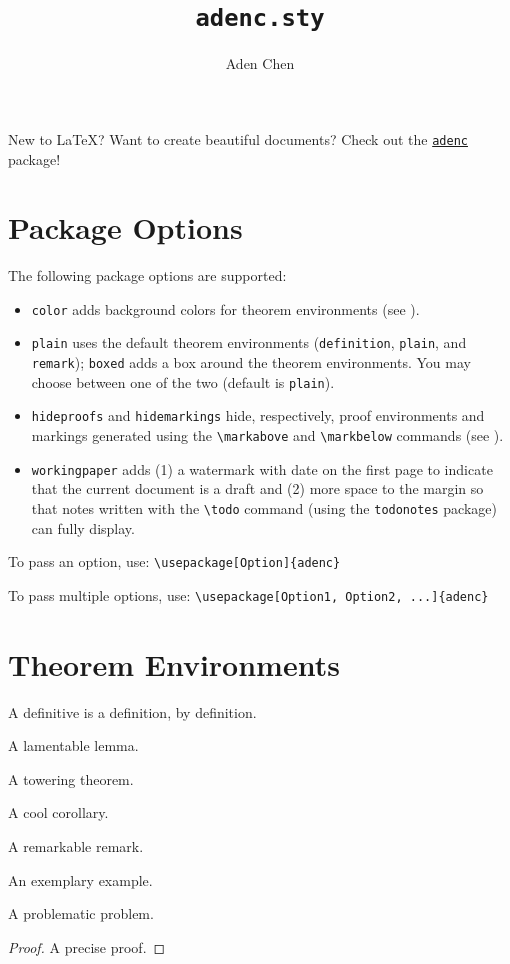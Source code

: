 \documentclass[11pt,oneside,letterpaper]{amsart}
\title{\texttt{adenc.sty}}
\author{Aden Chen}
\begin{document}
\maketitle
\tableofcontents

New to \LaTeX?
Want to create beautiful documents?
Check out the \href{https://github.com/AdenChen27/latex}{\texttt{adenc}} package!

\section{Package Options}
The following package options are supported:
\begin{itemize}
  \item \verb|color| adds background colors for theorem environments (see ). 
  \item \verb|plain| uses the default theorem environments (\texttt{definition}, \texttt{plain}, and \texttt{remark}); \verb|boxed| adds a box around the theorem environments.
  You may choose between one of the two (default is \verb|plain|).
  \item \verb|hideproofs| and \verb|hidemarkings| hide, respectively, proof environments and markings generated using the \verb|\markabove| and \verb|\markbelow| commands (see ). 
  \item \verb|workingpaper| adds (1) a watermark with date on the first page to indicate that the current document is a draft and (2) more space to the margin so that notes written with the \verb|\todo| command (using the \verb|todonotes| package) can fully display. 
\end{itemize}

\noindent
To pass an option, use: \verb|\usepackage[Option]{adenc}|

\noindent
To pass multiple options, use: \verb|\usepackage[Option1, Option2, ...]{adenc}|


\section{Theorem Environments}
\label{sec:thm-env}

\begin{definition}
  A definitive  is a definition, by definition. 
\end{definition}
\begin{lemma}
  A lamentable lemma. 
\end{lemma}
\begin{theorem}
  A towering theorem. 
\end{theorem}
\begin{corollary}
  A cool corollary. 
\end{corollary}
\begin{remark}
  A remarkable remark. 
\end{remark}
\begin{example}
  An exemplary example. 
\end{example}
\begin{problem}
  A problematic problem. 
\end{problem}
\begin{proof}
  A precise proof.
\end{proof}
\end{document}
